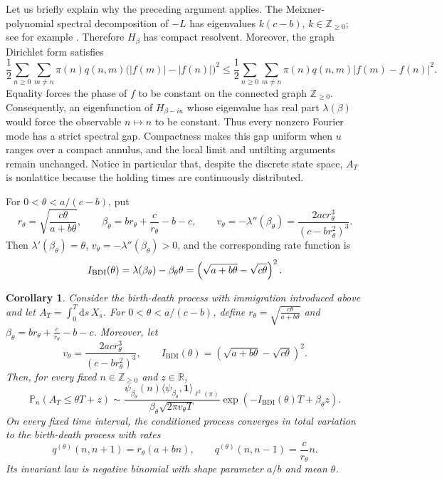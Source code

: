 \documentclass[11pt,reqno]{amsart}
\newtheorem{corollary}[theorem]{Corollary}
\theoremstyle{definition}
\numberwithin{equation}{section}
\newcommand{\<}{\langle}
\renewcommand{\>}{\rangle}
\def\Z{{\mathbb Z}}
\def\Z{{\mathbb Z}}
\def\de{{\rm d}}
\def\de{{\mathrm {d}}}
\def\bbP{{\mathbb{P}}}
\begin{document}
Let us briefly explain why the preceding argument applies. The
Meixner-polynomial spectral decomposition of $-L$ has eigenvalues $k(c-b)$, $k\in\Z_{\geq 0}$; see for example \cite[Section~2]{AscioneLeonenkoPirozzi}. Therefore $H_\beta$ has compact
resolvent. Moreover, the graph Dirichlet form satisfies
\[
 \frac12 \sum_{n \ge 0}\sum_{m\neq n}\pi(n)q(n,m)
 \bigl(|f(m)|-|f(n)|\bigr)^2
 \leq
 \frac12\sum_{n \ge 0}\sum_{m\neq n}\pi(n)q(n,m)|f(m)-f(n)|^2.
\]
Equality forces the phase of $f$ to be constant on the connected
graph $\Z_{\geq 0}$. Consequently, an eigenfunction of
$H_{\beta-iu}$ whose eigenvalue has real part $\lambda(\beta)$ would
force the observable $n\mapsto n$ to be constant. Thus every
nonzero Fourier mode has a strict spectral gap. Compactness makes
this gap uniform when $u$ ranges over a compact annulus, and the
local limit and untilting arguments remain unchanged. Notice in
particular that, despite the discrete state space, $A_T$ is
nonlattice because the holding times are continuously distributed.

For $0<\theta<a/(c-b)$, put
\[
 r_\theta=\sqrt{\frac{c\theta}{a+b\theta}},
 \qquad
 \beta_\theta
 =
 br_\theta+\frac{c}{r_\theta}-b-c,
 \qquad
 v_\theta = -\lambda''(\beta_\theta)
 =
 \frac{2ac r_\theta^3}{(c-br_\theta^2)^3}.
\]
Then $\lambda'(\beta_\theta)=\theta$,
$v_\theta=-\lambda''(\beta_\theta)>0$, and the corresponding rate
function is
\[
 I_{\rm BDI}(\theta)
 =
 \lambda(\beta_\theta)-\beta_\theta\theta
 =
 \left(\sqrt{a+b\theta}-\sqrt{c\theta}\right)^2.
\]

\begin{corollary}
\label{cor:bdi-extension}
Consider the birth-death process with immigration introduced above and let
    $A_T=\int_0^T \de s \, X_s$.
For $0<\theta<a/(c-b)$, define $r_\theta=\sqrt{\frac{c\theta}{a+b\theta}}$ and $\beta_\theta
      =br_\theta+\frac{c}{r_\theta}-b-c$.
Moreover, let
\[
    v_\theta
      =\frac{2ac r_\theta^3}{(c-br_\theta^2)^3},
    \qquad
    I_{\mathrm{BDI}}(\theta)
      =\left(
          \sqrt{a+b\theta}-\sqrt{c\theta}
       \right)^2.
\]
Then, for every fixed $n\in\mathbb Z_{\geq0}$ and $z\in\mathbb R$,
\[
    \bbP_n(A_T\leq\theta T+z)
    \sim
    \frac{
      \psi_{\beta_\theta}(n)
      \langle\psi_{\beta_\theta},\mathbf 1\rangle_{\ell^2(\pi)}
    }{
      \beta_\theta\sqrt{2\pi v_\theta T}
    }
    \exp\!\left(
       -I_{\mathrm{BDI}}(\theta)T+\beta_\theta z
    \right).
\]
On every fixed time interval, the conditioned process converges in total
variation to the birth-death process with rates
\[
    q^{(\theta)}(n,n+1)=r_\theta(a+bn),
    \qquad
    q^{(\theta)}(n,n-1)=\frac{c}{r_\theta}n.
\]
Its invariant law is negative binomial with shape parameter $a/b$ and
mean $\theta$.
\end{corollary}
\end{document}
